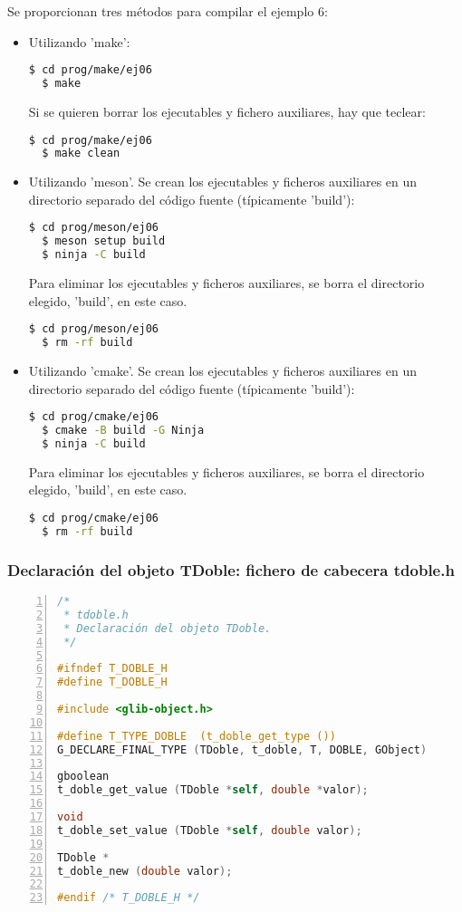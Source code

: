Se proporcionan tres métodos para compilar el ejemplo 6:
\begin{itemize}
  \tightlist
\item Utilizando 'make':
\begin{lstlisting}[language=bash]
  $ cd prog/make/ej06
  $ make
\end{lstlisting}
Si se quieren borrar los ejecutables y fichero auxiliares, hay que teclear:
\begin{lstlisting}[language=bash]
  $ cd prog/make/ej06
  $ make clean
\end{lstlisting}
\item Utilizando 'meson'.
  Se crean los ejecutables y ficheros auxiliares en un directorio separado del código fuente
  (típicamente 'build'):
\begin{lstlisting}[language=bash]
  $ cd prog/meson/ej06
  $ meson setup build
  $ ninja -C build
\end{lstlisting}
Para eliminar los ejecutables y ficheros auxiliares, se borra el directorio elegido, 'build', en este caso.
\begin{lstlisting}[language=bash]
  $ cd prog/meson/ej06
  $ rm -rf build
\end{lstlisting}
\item Utilizando 'cmake'.
  Se crean los ejecutables y ficheros auxiliares en un directorio separado del código fuente
  (típicamente 'build'):
\begin{lstlisting}[language=bash]
  $ cd prog/cmake/ej06
  $ cmake -B build -G Ninja
  $ ninja -C build
\end{lstlisting}
Para eliminar los ejecutables y ficheros auxiliares, se borra el directorio elegido, 'build', en este caso.
\begin{lstlisting}[language=bash]
  $ cd prog/cmake/ej06
  $ rm -rf build
\end{lstlisting}
\end{itemize}

\subsubsection{Declaración del objeto \textsf{TDoble}: fichero de cabecera \textsf{tdoble.h}}

\begin{lstlisting}[language=C, numbers=left]
/*
 * tdoble.h
 * Declaración del objeto TDoble.
 */

#ifndef T_DOBLE_H
#define T_DOBLE_H
 
#include <glib-object.h>
 
#define T_TYPE_DOBLE  (t_doble_get_type ())
G_DECLARE_FINAL_TYPE (TDoble, t_doble, T, DOBLE, GObject)
 
gboolean
t_doble_get_value (TDoble *self, double *valor);
 
void
t_doble_set_value (TDoble *self, double valor);
 
TDoble *
t_doble_new (double valor);

#endif /* T_DOBLE_H */
\end{lstlisting}

